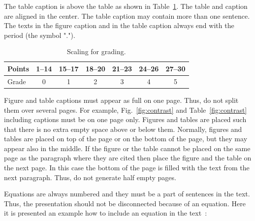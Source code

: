 \documentclass{lutmscthesis}[2017/10/03]
\begin{document}
The table caption is above the table as shown in Table~\ref{tab:grading}. 
The table and caption are aligned in the center. 
The table caption may contain more than one sentence. 
The texts in the figure caption and in the table caption always end with the period (the symbol "."). 

\begin{table}[ht]
\caption{Scaling for grading.}
\vspace{-12pt}
\begin{center}
\begin{tabular}{|l|c|c|c|c|c|c|}
\hline
Points &1--14 & 15--17 & 18--20 & 21--23 & 24--26 & 27--30\\
\hline
Grade &0&1&2&3&4&5\\
\hline
\end{tabular}
\label{tab:grading}
\end{center}
\end{table}

Figure and table captions must appear as full on one page. 
Thus, do not split them over several pages. 
For example, Fig.~\ref{fig:contrast} and Table~\ref{fig:contrast} including captions must be on one page only. 
Figures and tables are placed such that there is no extra empty space above or below them. 
Normally, figures and tables are placed on top of the page or on the bottom of the page, 
but they may appear also in the middle. 
If the figure or the table cannot be placed on the same page as the paragraph 
where they are cited then place the figure and the table on the next page. 
In this case the bottom of the page is filled with the text from the next paragraph.  
Thus, do not generate half empty pages. 

Equations are always numbered and they must be a part of sentences in the text. 
Thus, the presentation should not be disconnected because of an equation. 
Here it is presented an example how to include an equation in the text~\cite{zafari2017comparison}:  
\end{document}
